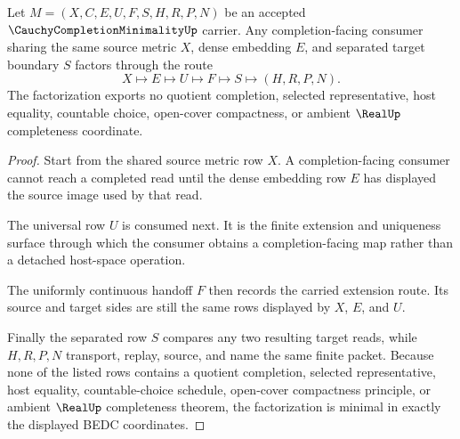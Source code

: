 \begin{theorem}
\label{thm:cauchy-completion-minimality-universal-factorization}
Let $M=(X,C,E,U,F,S,H,R,P,N)$ be an accepted $\CauchyCompletionMinimalityUp$ carrier. Any completion-facing consumer sharing the same source metric $X$, dense embedding $E$, and separated target boundary $S$ factors through the route
$$
X\longmapsto E\longmapsto U\longmapsto F\longmapsto S\longmapsto(H,R,P,N).
$$
The factorization exports no quotient completion, selected representative, host equality, countable choice, open-cover compactness, or ambient $\RealUp$ completeness coordinate.
\end{theorem}
\begin{proof}
Start from the shared source metric row $X$. A completion-facing consumer cannot reach a completed read until the dense embedding row $E$ has displayed the source image used by that read.

The universal row $U$ is consumed next. It is the finite extension and uniqueness surface through which the consumer obtains a completion-facing map rather than a detached host-space operation.

The uniformly continuous handoff $F$ then records the carried extension route. Its source and target sides are still the same rows displayed by $X$, $E$, and $U$.

Finally the separated row $S$ compares any two resulting target reads, while $H,R,P,N$ transport, replay, source, and name the same finite packet. Because none of the listed rows contains a quotient completion, selected representative, host equality, countable-choice schedule, open-cover compactness principle, or ambient $\RealUp$ completeness theorem, the factorization is minimal in exactly the displayed BEDC coordinates.
\end{proof}

